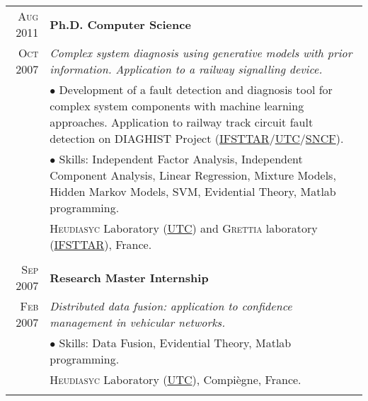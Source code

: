 \documentclass[a4paper,10pt]{article}
\begin{document}
\begin{tabular}{r|p{14cm}}
\textsc{Aug 2011}&\textbf{Ph.D. Computer Science} \\
\textsc{Oct 2007}& \emph{Complex system diagnosis using generative models with prior information. Application to a railway signalling device.}\\
& $\bullet$ Development of a fault detection and diagnosis tool for complex system components with machine learning approaches.
Application to railway track circuit fault detection on DIAGHIST Project (\href{http://www.ifsttar.fr}{IFSTTAR}/\href{http://www.utc.fr}{UTC}/\href{http://www.sncf.com/}{SNCF}).\\
& $\bullet$ Skills: Independent Factor Analysis, Independent Component Analysis, Linear Regression, Mixture Models, Hidden Markov Models, SVM, Evidential Theory, Matlab programming.\\
& \footnotesize{\textsc{Heudiasyc} Laboratory (\href{http://www.utc.fr}{UTC}) and  \textsc{Grettia} laboratory (\href{http://www.ifsttar.fr}{IFSTTAR}), France}.\\ \multicolumn{2}{c}{} \\



\textsc{Sep 2007} & \textbf{Research Master Internship}  \\
\textsc{Feb 2007}&\emph{Distributed data fusion: application to confidence management in vehicular networks.}\\
& $\bullet$ Skills: Data Fusion, Evidential Theory, Matlab programming.\\
&\footnotesize{\textsc{Heudiasyc} Laboratory (\href{http://www.utc.fr}{UTC}), Compi\`egne, France.}\\\multicolumn{2}{c}{} \\
 

\end{tabular}
\end{document}
